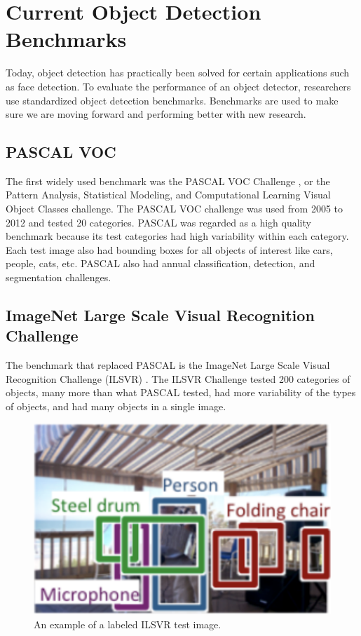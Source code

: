 \documentclass{article}
\begin{document}
\section{Current Object Detection Benchmarks}
Today, object detection has practically been solved for certain applications such as face detection. To evaluate the performance of an object detector, researchers use standardized object detection benchmarks. Benchmarks are used to make sure we are moving forward and performing better with new research.

\subsection{PASCAL VOC} 
The first widely used benchmark was the PASCAL VOC Challenge \cite{pascal-voc-2012}, or the Pattern Analysis, Statistical Modeling, and Computational Learning Visual Object Classes challenge. The PASCAL VOC challenge was used from 2005 to 2012 and tested 20 categories. PASCAL was regarded as a high quality benchmark because its test categories had high variability within each category. Each test image also had bounding boxes for all objects of interest like cars, people, cats, etc. PASCAL also had annual classification, detection, and segmentation challenges.

\subsection{ImageNet Large Scale Visual Recognition Challenge}
The benchmark that replaced PASCAL is the ImageNet Large Scale Visual Recognition Challenge (ILSVR) \cite{ILSVRC15}. The ILSVR Challenge tested 200 categories of objects, many more than what PASCAL tested, had more variability of the types of objects, and had many objects in a single image.

\begin{figure}[h]
	\includegraphics[width=\textwidth]{ilsvr.png}
    \caption{An example of a labeled ILSVR test image.}
\end{figure}
\end{document}

